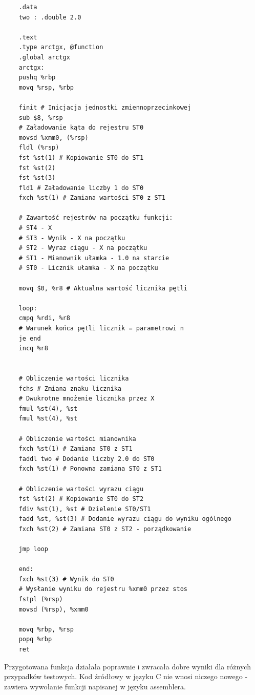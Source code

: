 \documentclass[a4paper,12pt]{article}
\begin{document}
\begin{verbatim}
	.data
	two : .double 2.0
	
	.text
	.type arctgx, @function
	.global arctgx
	arctgx:
	pushq %rbp
	movq %rsp, %rbp
	
	finit # Inicjacja jednostki zmiennoprzecinkowej
	sub $8, %rsp 
	# Załadowanie kąta do rejestru ST0
	movsd %xmm0, (%rsp)
	fldl (%rsp)
	fst %st(1) # Kopiowanie ST0 do ST1
	fst %st(2)
	fst %st(3)
	fld1 # Załadowanie liczby 1 do ST0
	fxch %st(1) # Zamiana wartości ST0 z ST1
	
	# Zawartość rejestrów na początku funkcji:
	# ST4 - X
	# ST3 - Wynik - X na początku
	# ST2 - Wyraz ciągu - X na początku
	# ST1 - Mianownik ułamka - 1.0 na starcie
	# ST0 - Licznik ułamka - X na początku
	
	movq $0, %r8 # Aktualna wartość licznika pętli
	
	loop:
	cmpq %rdi, %r8
	# Warunek końca pętli licznik = parametrowi n
	je end
	incq %r8
	
	
	# Obliczenie wartości licznika
	fchs # Zmiana znaku licznika
	# Dwukrotne mnożenie licznika przez X
	fmul %st(4), %st
	fmul %st(4), %st
	
	# Obliczenie wartości mianownika
	fxch %st(1) # Zamiana ST0 z ST1
	faddl two # Dodanie liczby 2.0 do ST0
	fxch %st(1) # Ponowna zamiana ST0 z ST1
	
	# Obliczenie wartości wyrazu ciągu
	fst %st(2) # Kopiowanie ST0 do ST2
	fdiv %st(1), %st # Dzielenie ST0/ST1
	fadd %st, %st(3) # Dodanie wyrazu ciągu do wyniku ogólnego
	fxch %st(2) # Zamiana ST0 z ST2 - porządkowanie
	
	jmp loop
	
	end:
	fxch %st(3) # Wynik do ST0
	# Wysłanie wyniku do rejestru %xmm0 przez stos
	fstpl (%rsp) 
	movsd (%rsp), %xmm0
	
	movq %rbp, %rsp
	popq %rbp
	ret
\end{verbatim}
Przygotowana funkcja działała poprawnie i zwracała dobre wyniki dla różnych przypadków testowych. Kod źródłowy w języku C nie wnosi niczego nowego - zawiera wywołanie funkcji napisanej w języku assemblera.
\end{document}

